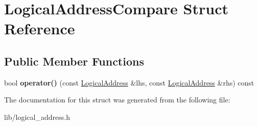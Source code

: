 \hypertarget{structLogicalAddressCompare}{}\section{Logical\+Address\+Compare Struct Reference}
\label{structLogicalAddressCompare}
\subsection*{Public Member Functions}
\begin{DoxyCompactItemize}
\item 
\mbox{\label{structLogicalAddressCompare_aa509931ff644dc8f60f77467d7d76a3c}} 
bool {\bfseries operator()} (const \hyperlink{structLogicalAddress}{Logical\+Address} \&lhs, const \hyperlink{structLogicalAddress}{Logical\+Address} \&rhs) const
\end{DoxyCompactItemize}


The documentation for this struct was generated from the following file\+:\begin{DoxyCompactItemize}
\item 
lib/logical\+\_\+address.\+h\end{DoxyCompactItemize}
